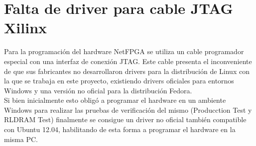 

\section{Falta de driver para cable JTAG Xilinx}
Para la programación del hardware NetFPGA se utiliza un cable programador especial con una interfaz de conexi\'on JTAG.  Este cable presenta el inconveniente de que sus fabricantes no desarrollaron drivers para la distribución de Linux con la que se trabaja en este proyecto, existiendo drivers oficiales para entornos Windows y una versi\'on no oficial para la distribución Fedora.\\

Si bien inicialmente esto oblig\'o a programar el hardware en un ambiente Windows para realizar las pruebas de verificaci\'on del mismo (Producction Test y RLDRAM Test) finalmente se consigue un driver no oficial\cite{JtagD} tambi\'en compatible con Ubuntu 12.04, habilitando de esta forma a programar el hardware en la misma PC.




